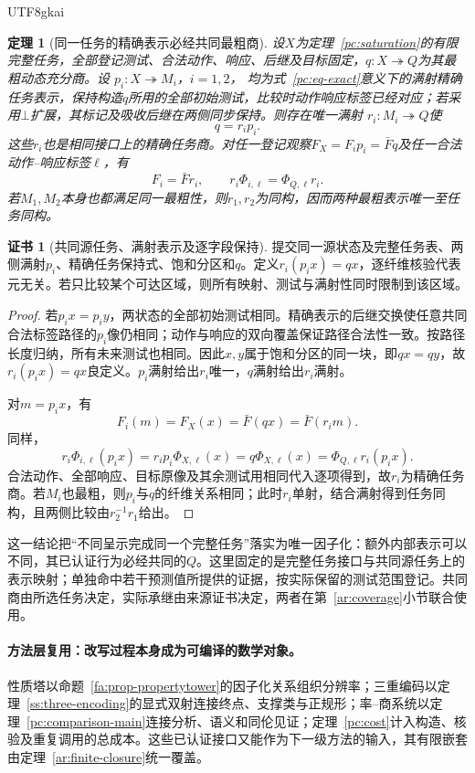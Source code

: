 \documentclass[11pt,a4paper]{article}
\theoremstyle{plain}
\newtheorem{theorem}{定理}[section]
\theoremstyle{definition}
\newtheorem*{certificate}{证书}
\theoremstyle{remark}
\begin{document}
\begin{CJK*}{UTF8}{gkai}
\begin{theorem}[同一任务的精确表示必经共同最粗商]
\label{ar:common-quotient}
设$X$为定理~\ref{pc:saturation}的有限完整任务，全部登记测试、合法动作、响应、后继及目标固定，$q:X\twoheadrightarrow Q$为其最粗动态充分商。设
$p_i:X\twoheadrightarrow M_i$，$i=1,2$，
均为式~\eqref{pc:eq-exact}意义下的满射精确任务表示，保持构造$q$所用的全部初始测试，比较时动作响应标签已经对应；若采用$\bot$扩展，其标记及吸收后继在两侧同步保持。则存在唯一满射
$r_i:M_i\twoheadrightarrow Q$使
\[
 q=r_i p_i.
\]
这些$r_i$也是相同接口上的精确任务商。对任一登记观察$F_X=F_i p_i=\bar Fq$及任一合法动作--响应标签$\ell$，有
\[
 F_i=\bar F r_i,\qquad
 r_i\Phi_{i,\ell}=\Phi_{Q,\ell}r_i.
\]
若$M_1,M_2$本身也都满足同一最粗性，则$r_1,r_2$为同构，因而两种最粗表示唯一至任务同构。
\end{theorem}
\begin{certificate}[共同源任务、满射表示及逐字段保持]
提交同一源状态及完整任务表、两侧满射$p_i$、精确任务保持式、饱和分区和$q$。定义$r_i(p_i x)=qx$，逐纤维核验代表元无关。若只比较某个可达区域，则所有映射、测试与满射性同时限制到该区域。
\end{certificate}
\begin{proof}
若$p_i x=p_i y$，两状态的全部初始测试相同。精确表示的后继交换使任意共同合法标签路径的$p_i$像仍相同；动作与响应的双向覆盖保证路径合法性一致。按路径长度归纳，所有未来测试也相同。因此$x,y$属于饱和分区的同一块，即$qx=qy$，故$r_i(p_i x)=qx$良定义。$p_i$满射给出$r_i$唯一，$q$满射给出$r_i$满射。

对$m=p_i x$，有
\[
 F_i(m)=F_X(x)=\bar F(qx)=\bar F(r_i m).
\]
同样，
\[
 r_i\Phi_{i,\ell}(p_i x)
 =r_i p_i\Phi_{X,\ell}(x)
 =q\Phi_{X,\ell}(x)
 =\Phi_{Q,\ell}r_i(p_i x).
\]
合法动作、全部响应、目标原像及其余测试用相同代入逐项得到，故$r_i$为精确任务商。若$M_i$也最粗，则$p_i$与$q$的纤维关系相同；此时$r_i$单射，结合满射得到任务同构，且两侧比较由$r_2^{-1}r_1$给出。
\end{proof}

这一结论把“不同呈示完成同一个完整任务”落实为唯一因子化：额外内部表示可以不同，其已认证行为必经共同的$Q$。这里固定的是完整任务接口与共同源任务上的表示映射；单独命中若干预测值所提供的证据，按实际保留的测试范围登记。共同商由所选任务决定，实际承继由来源证书决定，两者在第~\ref{ar:coverage}小节联合使用。

\paragraph{方法层复用：改写过程本身成为可编译的数学对象。}
性质塔以命题~\ref{fa:prop-propertytower}的因子化关系组织分辨率；三重编码以定理~\ref{ss:three-encoding}的显式双射连接终点、支撑类与正规形；率--商系统以定理~\ref{pc:comparison-main}连接分析、语义和同伦见证；定理~\ref{pc:cost}计入构造、核验及重复调用的总成本。这些已认证接口又能作为下一级方法的输入，其有限嵌套由定理~\ref{ar:finite-closure}统一覆盖。


\end{CJK*}
\end{document}
